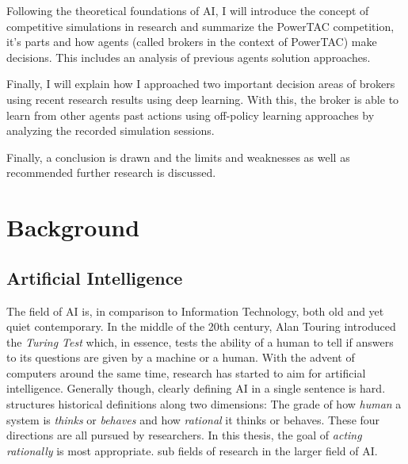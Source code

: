 
Following the theoretical foundations of \ac{AI},  I will introduce the concept of competitive simulations in research
and summarize the \ac{PowerTAC} competition, it's parts and how agents (called brokers in the context of \ac{PowerTAC})
make decisions. This includes an analysis of previous agents solution approaches. 

Finally, I will explain how I approached two important decision areas of brokers using recent research results using
deep learning. With this, the broker is able to learn from other agents past actions using off-policy learning
approaches by analyzing the recorded simulation sessions. 

Finally, a conclusion is drawn and the limits and weaknesses as well as recommended further research is discussed.

\chapter{Background}

\section{Artificial Intelligence}%
\label{sec:artificial_intelligence}

The field of \ac {AI} is, in comparison to Information Technology, both old and yet quiet contemporary. In the middle of
the 20th century, Alan Touring introduced the \emph{Turing Test} which, in essence, tests the ability of a human to tell
if answers to its questions are given by a machine or a human. With the advent of computers around the same time,
research has started to aim for artificial intelligence. Generally though, clearly defining \ac {AI} in a single sentence is hard.
\citet{russell2016artificial} structures historical definitions along two dimensions: The grade of how \emph{human} a system is \emph{thinks} or
\emph{behaves} and how \emph{rational} it thinks or behaves. These four directions are all pursued by researchers. In
this thesis, the goal of \emph{acting rationally} is most appropriate. 
sub fields of research in the larger field of \ac {AI}. 

